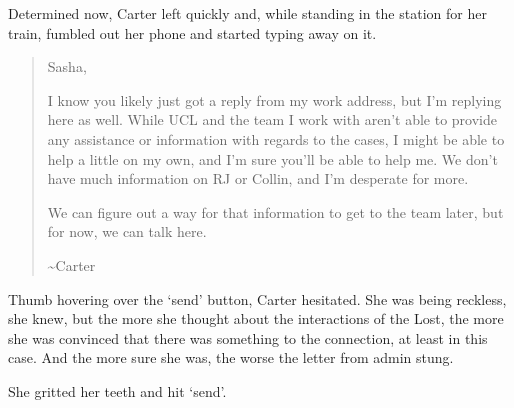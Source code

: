 Determined now, Carter left quickly and, while standing in the station for her train, fumbled out her phone and started typing away on it.

\begin{quote}
Sasha,

I know you likely just got a reply from my work address, but I'm replying here as well. While UCL and the team I work with aren't able to provide any assistance or information with regards to the cases, I might be able to help a little on my own, and I'm sure you'll be able to help me. We don't have much information on RJ or Collin, and I'm desperate for more.

We can figure out a way for that information to get to the team later, but for now, we can talk here.

\textasciitilde{}Carter
\end{quote}

Thumb hovering over the `send' button, Carter hesitated. She was being reckless, she knew, but the more she thought about the interactions of the Lost, the more she was convinced that there was something to the connection, at least in this case. And the more sure she was, the worse the letter from admin stung.

She gritted her teeth and hit `send'.
